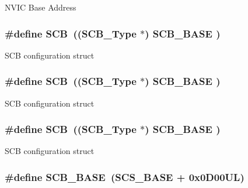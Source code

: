 N\-V\-I\-C Base Address \hypertarget{group___c_m_s_i_s__core__register_gaaaf6477c2bde2f00f99e3c2fd1060b01}{
\subsubsection[{S\-C\-B}]{\setlength{\rightskip}{0pt plus 5cm}\#define S\-C\-B~(({\bf S\-C\-B\-\_\-\-Type}       $\ast$)     {\bf S\-C\-B\-\_\-\-B\-A\-S\-E}      )}}\label{group___c_m_s_i_s__core__register_gaaaf6477c2bde2f00f99e3c2fd1060b01}
S\-C\-B configuration struct \hypertarget{group___c_m_s_i_s__core__register_gaaaf6477c2bde2f00f99e3c2fd1060b01}{
\subsubsection[{S\-C\-B}]{\setlength{\rightskip}{0pt plus 5cm}\#define S\-C\-B~(({\bf S\-C\-B\-\_\-\-Type}       $\ast$)     {\bf S\-C\-B\-\_\-\-B\-A\-S\-E}      )}}\label{group___c_m_s_i_s__core__register_gaaaf6477c2bde2f00f99e3c2fd1060b01}
S\-C\-B configuration struct \hypertarget{group___c_m_s_i_s__core__register_gaaaf6477c2bde2f00f99e3c2fd1060b01}{
\subsubsection[{S\-C\-B}]{\setlength{\rightskip}{0pt plus 5cm}\#define S\-C\-B~(({\bf S\-C\-B\-\_\-\-Type}       $\ast$)     {\bf S\-C\-B\-\_\-\-B\-A\-S\-E}      )}}\label{group___c_m_s_i_s__core__register_gaaaf6477c2bde2f00f99e3c2fd1060b01}
S\-C\-B configuration struct \hypertarget{group___c_m_s_i_s__core__register_gad55a7ddb8d4b2398b0c1cfec76c0d9fd}{
\subsubsection[{S\-C\-B\-\_\-\-B\-A\-S\-E}]{\setlength{\rightskip}{0pt plus 5cm}\#define S\-C\-B\-\_\-\-B\-A\-S\-E~({\bf S\-C\-S\-\_\-\-B\-A\-S\-E} +  0x0\-D00\-U\-L)}}\label{group___c_m_s_i_s__core__register_gad55a7ddb8d4b2398b0c1cfec76c0d9fd}
